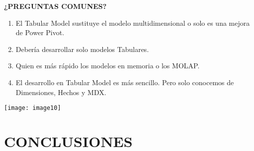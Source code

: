 \documentclass{article} %
\begin{document}
\noindent 

\noindent \textbf{¿PREGUNTAS COMUNES?}

\noindent 

\begin{enumerate}
\item  El Tabular Model sustituye el modelo multidimensional o solo es una mejora de Power Pivot.

\item  Deber\'{i}a desarrollar solo modelos Tabulares.

\item  Quien es m\'{a}s r\'{a}pido los modelos en memoria o los MOLAP.

\item  El desarrollo en Tabular Model es m\'{a}s sencillo. Pero solo conocemos de Dimensiones, Hechos y MDX.
\end{enumerate}

\noindent 

\noindent \texttt{[image: image10]}

\noindent 

\noindent 

\noindent 

\noindent 

\noindent 

\noindent 

\noindent 

\noindent 

\noindent 

\noindent 

\noindent 

\noindent 

\noindent 

\noindent 

\noindent 

\noindent 
\section{CONCLUSIONES}

\noindent 
\end{document}
